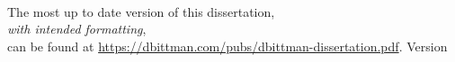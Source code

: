 {}

\begingroup
\let\clearpage\relax
\let\cleardoublepage\relax
\let\cleardoublepage\relax

\vspace*{40mm}
\begin{center}
    {
        \Large {}
    }\\
    \vspace*{20mm}
    The most up to date version of this dissertation,\\
    \emph{with intended formatting},\\
    can be found at \url{https://dbittman.com/pubs/dbittman-dissertation.pdf}.
    \medskip
    Version \myVersion
\end{center}
\vfill

\endgroup

